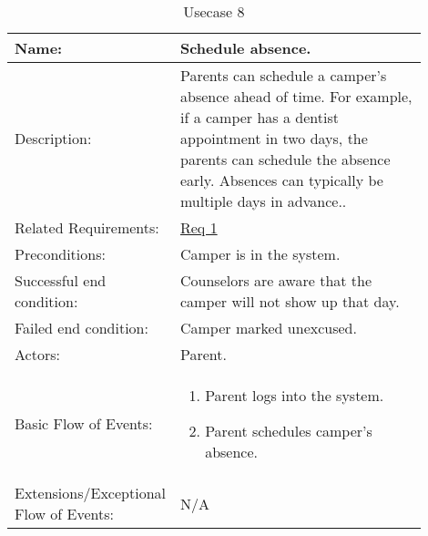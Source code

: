 \documentclass[11pt]{article}
\begin{document}
\begin{table}[!htb]
\caption{Usecase 8}
\label{des:schedule absence}
\begin{center}
\begin{tabular}{p{0.30\linewidth}p{0.60\linewidth}}
	Name: & Schedule absence.\\\hline
	Description: & Parents can schedule a camper's absence ahead of time. For example, if a camper has a dentist appointment in two days, the parents can schedule the absence early. Absences can typically be multiple days in advance..\\\hline
	Related Requirements:& \hyperlink{Req1}{Req 1}\\\hline
	Preconditions:& Camper is in the system.\\\hline
	Successful end condition:& Counselors are aware that the camper will not show up that day. \\\hline
	Failed end condition:& Camper marked unexcused.\\\hline
	Actors:& Parent. \\\hline
	Basic Flow of Events: & \begin{enumerate}[topsep=0pt]
		\item Parent logs into the system.
		\item Parent schedules camper's absence.
	\end{enumerate}\\\hline
	Extensions/Exceptional Flow of Events: & \vspace*{.25em}  N/A
\end{tabular}
\end{center}
\end{table}



\end{document}
